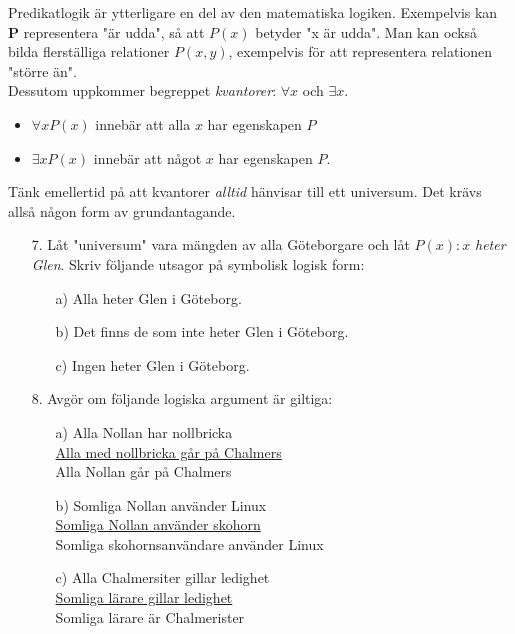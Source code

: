 \documentclass{article}
\begin{document}
Predikatlogik är ytterligare en del av den matematiska logiken. Exempelvis kan {\bf P} representera "är udda", så att $P(x)$ betyder "x är udda". Man kan också bilda flerställiga relationer $P(x,y)$, exempelvis för att representera relationen "större än".\\
Dessutom uppkommer begreppet {\it kvantorer}: $\forall x$ och $\exists x$. 
\begin{itemize}
\item $\forall x P(x)$ innebär att alla $x$ har egenskapen $P$
\item $\exists x P(x)$ innebär att något $x$ har egenskapen $P$.
\end{itemize}
Tänk emellertid på att kvantorer {\it alltid} hänvisar till ett universum. Det krävs allså någon form av grundantagande.

\pagebreak

\begin{enumerate}
\item[7.] Låt "universum" vara mängden av alla Göteborgare och låt $P(x) : x$ {\it heter Glen}.
Skriv följande utsagor på symbolisk logisk form:
\begin{itemize}
\item[a)] Alla heter Glen i Göteborg.
\item[b)] Det finns de som inte heter Glen i Göteborg.
\item[c)] Ingen heter Glen i Göteborg.
\end{itemize}

\item[8.] Avgör om följande logiska argument är giltiga:
\begin{itemize}
\item[a)] Alla Nollan har nollbricka\\
\underline {Alla med nollbricka går på Chalmers}\\
Alla Nollan går på Chalmers
\\
\item[b)] Somliga Nollan använder Linux\\
\underline{Somliga Nollan använder skohorn}\\
Somliga skohornsanvändare använder Linux
\\
\item[c)] Alla Chalmersiter gillar ledighet\\
\underline{Somliga lärare gillar ledighet}\\
Somliga lärare är Chalmerister
\\
\end{itemize}

\end{enumerate}
\end{document}
